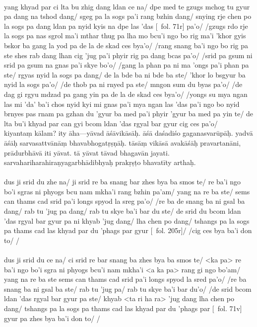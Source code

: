 \documentclass[12pt]{article}
\newcommand{\emdash} {\hspace{0em}—\hspace{0em}}
\begin{document}
\textbf{\TVB}\\
yang khyad par ci lta bu zhig dang ldan ce na/ dpe med te gzugs mchog tu gyur pa dang na tshod dang/ sgeg pa la sogs pa'i rang bzhin dang/ snying rje chen po la sogs pa dang ldan pa nyid kyis na dpe las 'das [\TVB\ fol. 71r] pa'o/ /gzugs rdo rje la sogs pa nas sgrol ma'i mthar thug pa lha mo bcu'i ngo bo rig ma'i 'khor gyis bskor ba gang la yod pa de la de skad ces bya'o/ /rang snang ba'i ngo bo rig pa ste shes rab dang lhan cig 'jug pa'i phyir rig pa dang bcas pa'o/ /srid pa gsum ni srid pa gsum na gnas pa'i skye bo'o/ /gang la phan pa ni ma 'ongs pa'i phan pa ste/ rgyas nyid la sogs pa dang/ de la bde ba ni bde ba ste/ 'khor lo bsgyur ba nyid la sogs pa'o/ /de thob pa ni rnyed pa ste/ mngon sum du byas pa'o/ /de dag gi rgyu mdzad pa gang yin pa de la de skad ces bya'o/ /yongs su mya ngan las mi 'da' ba'i chos nyid kyi mi gnas pa'i mya ngan las 'das pa'i ngo bo nyid brnyes pas rnam pa gzhan du 'gyur ba med pa'i phyir 'gyur ba med pa yin te/ de lta bu'i khyad par can gyi bcom ldan 'das rgyal bar gyur cig ces pa'o/\\

kiyantaṃ kālam? ity āha\emdash yāvad āśāvikāsāḥ. āśā daśadiśo gaganasvarūpāḥ. yadvā āśāḥ sarvasattvānāṃ bhavabhogatṛṣṇāḥ. tāsāṃ vikāsā avakāśāḥ pravartanāni, prādurbhāvā iti yāvat. tā yāvat tāvad bhagavān jayati. sarvahariharahiraṇyagarbhādibhyaḥ prakṛṣṭo bhavatīty arthaḥ.\\

\textbf{\TVA}\\
dus ji srid du zhe na/ ji srid re ba snang bar zhes bya ba smos te/ re ba'i ngo bo'i sgras ni phyogs bcu nam mkha'i rang bzhin pa'am/ yang na re ba ste/ sems can thams cad srid pa'i longs spyod la sreg pa'o/ /re ba de snang ba ni gsal ba dang/ rab tu 'jug pa dang/ rab tu skye ba'i bar du ste/ de srid du bcom ldan 'das rgyal bar gyur pa ni khyab 'jug dang/ lha chen po dang/ tshangs pa la sogs pa thams cad las khyad par du 'phags par gyur [\TVA\ fol. 205r]/ /cig ces bya ba'i don to/ /\\

\textbf{\TVB}\\
dus ji srid du ce na/ ci srid re bar snang ba zhes bya ba smos te/ <ka pa> re ba'i ngo bo'i sgra ni phyogs bcu'i nam mkha'i <a ka pa> rang gi ngo bo'am/ yang na re ba ste sems can thams cad srid pa'i longs spyod la sred pa'o/ /re ba snang ba ni gsal ba ste/ rab tu 'jug pa/ rab tu skye ba'i bar du'o/ /de srid bcom ldan 'das rgyal bar gyur pa ste/ khyab <ta ri ha ra> 'jug dang lha chen po dang/ tshangs pa la sogs pa thams cad las khyad par du 'phags par [\TVB\ fol. 71v] gyur pa zhes bya ba'i don to/ /\\
\end{document}
